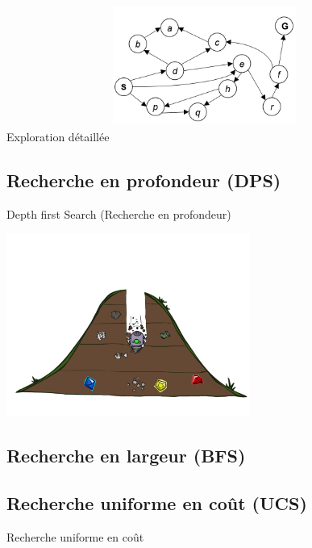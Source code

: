 \documentclass{beamer}
\begin{document}
\begin{frame}[t]{Exploration détaillée}
 \centering 
 \includegraphics[width=6cm,height=5cm]{./images/tiny_graphe.png}
\end{frame}
\subsection{Recherche en profondeur (DPS)}%
\label{sub:recherche_en_profondeur_dps_}
\begin{frame}[t]{Depth first Search (Recherche en profondeur)}
 
  \centering
  \includegraphics[width=8cm,height=6cm]{./images/depth_first_search.png}
\end{frame}


\subsection{Recherche en largeur (BFS)}%
\label{sub:recherche_en_largeur_bfs_}


\subsection{Recherche uniforme en coût (UCS)}%
\label{sub:recherche_uniforme_en_cout_ucs_}
\begin{frame}[t]{Recherche uniforme en coût}
  
\end{frame}
\end{document}
